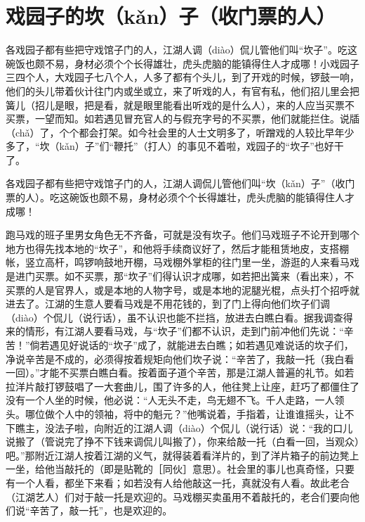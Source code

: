 \documentclass[12pt,UTF8]{ctexbook}
\begin{document}
\section{戏园子的坎（kǎn）子（收门票的人）}


各戏园子都有些把守戏馆子门的人，江湖人调（diào）侃儿管他们叫“坎子”。吃这碗饭也颇不易，身材必须个个长得雄壮，虎头虎脑的能镇得住人才成哪！小戏园子三四个人，大戏园子七八个人，人多了都有个头儿，到了开戏的时候，锣鼓一响，他们的头儿带着伙计往门内或坐或立，来了听戏的人，有官有私，他们招儿里会把簧儿（招儿是眼，把是看，就是眼里能看出听戏的是什么人），来的人应当买票不买票，一望而知。如若遇见冒充官人的与假充字号的不买票，他们就能拦住。说牐（chǎ）了，个个都会打架。如今社会里的人士文明多了，听蹭戏的人较比早年少多了，“坎（kǎn）子”们“鞭托”（打人）的事见不着啦，戏园子的“坎子”也好干了。

各戏园子都有些把守戏馆子门的人，江湖人调侃儿管他们叫“坎（kǎn）子”（收门票的人）。吃这碗饭也颇不易，身材必须个个长得雄壮，虎头虎脑的能镇得住人才成哪！



跑马戏的班子里男女角色无不齐备，可就是没有坎子。他们马戏班子不论开到哪个地方也得先找本地的“坎子”，和他将手续商议好了，然后才能租赁地皮，支搭棚帐，竖立高杆，鸣锣响鼓地开棚，马戏棚外掌柜的往门里一坐，游逛的人来看马戏是进门买票。如不买票，那“坎子”们得认识才成哪，如若把出簧来（看出来），不买票的人是官界人，或是本地的人物字号，或是本地的泥腿光棍，点头打个招呼就进去了。江湖的生意人要看马戏是不用花钱的，到了门上得向他们坎子们调（diào）个侃儿（说行话），虽不认识也能不拦挡，放进去白瞧白看。据我调查得来的情形，有江湖人要看马戏，与“坎子”们都不认识，走到门前冲他们先说：“辛苦！”倘若遇见好说话的“坎子”成了，就能进去白瞧；如若遇见难说话的坎子们，净说辛苦是不成的，必须得按着规矩向他们坎子说：“辛苦了，我敲一托（我白看一回）。”才能不买票白瞧白看。按着面子道个辛苦，那是江湖人普遍的礼节。如若拉洋片敲打锣鼓唱了一大套曲儿，围了许多的人，他往凳上让座，赶巧了都僵住了没有一个人坐的时候，他必说：“人无头不走，鸟无翅不飞。千人走路，一人领头。哪位做个人中的领袖，将中的魁元？”他嘴说着，手指着，让谁谁摇头，让不下瞧主，没法子啦，向附近的江湖人调（diào）个侃儿（说行话）说：“我的口儿说搬了（管说完了挣不下钱来调侃儿叫搬了），你来给敲一托（白看一回，当观众）吧。”那附近江湖人按着江湖的义气，就得装着看洋片的，到了洋片箱子的前边凳上一坐，给他当敲托的（即是贴靴的［同伙］意思）。社会里的事儿也真奇怪，只要有一个人看，都坐下来看；如若没有人给他敲这一托，真就没有人看。故此老合（江湖艺人）们对于敲一托是欢迎的。马戏棚买卖虽用不着敲托的，老合们要向他们说“辛苦了，敲一托”，也是欢迎的。
\end{document}
